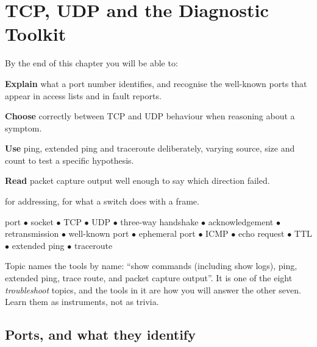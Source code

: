 \chapter{TCP, UDP and the Diagnostic Toolkit}\label{ch:transport}

\begin{outcomes}
By the end of this chapter you will be able to:
\begin{tight}
  \item \textbf{Explain} what a port number identifies, and recognise the
        well-known ports that appear in access lists and in fault reports.
  \item \textbf{Choose} correctly between TCP and UDP behaviour when reasoning
        about a symptom.
  \item \textbf{Use} ping, extended ping and traceroute deliberately, varying
        source, size and count to test a specific hypothesis.
  \item \textbf{Read} packet capture output well enough to say which direction
        failed.
\end{tight}
\end{outcomes}

\begin{prereq}
 for addressing,  for what a switch does with a
frame.
\end{prereq}

\begin{keyterms}
port $\bullet$ socket $\bullet$ TCP $\bullet$ UDP $\bullet$ three-way handshake
$\bullet$ acknowledgement $\bullet$ retransmission $\bullet$ well-known port
$\bullet$ ephemeral port $\bullet$ ICMP $\bullet$ echo request $\bullet$ TTL
$\bullet$ extended ping $\bullet$ traceroute
\end{keyterms}

\begin{examnote}
Topic  names the tools by name: ``show commands (including show logs),
ping, extended ping, trace route, and packet capture output''. It is one of the
eight \emph{troubleshoot} topics, and the tools in it are how you will answer the
other seven. Learn them as instruments, not as trivia.
\end{examnote}

\section{Ports, and what they identify}

